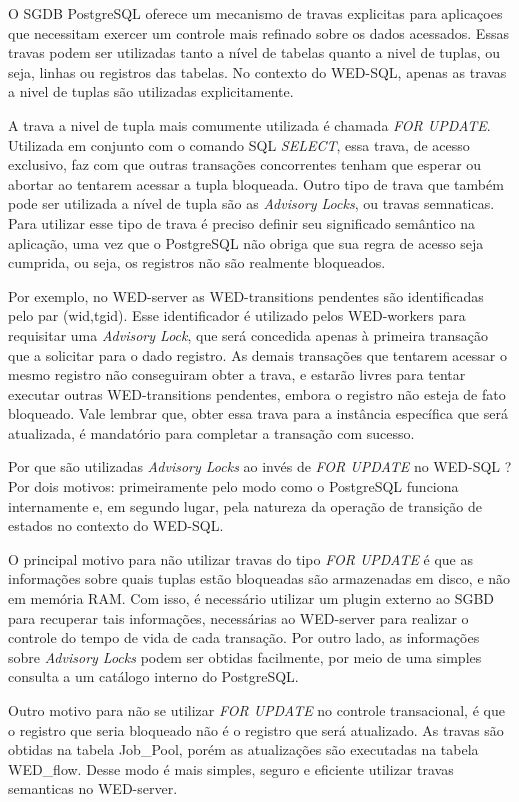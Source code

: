 \documentclass[conference]{IEEEtran}
\begin{document}
\par O SGDB PostgreSQL oferece um mecanismo de travas explicitas para aplicaçoes que necessitam exercer um controle mais
refinado sobre os dados acessados. Essas travas podem ser utilizadas tanto a nível de tabelas quanto a nivel de tuplas, ou seja,
linhas ou registros das tabelas. No contexto do WED-SQL, apenas as travas a nivel de tuplas são utilizadas explicitamente.
\par A trava a nivel de tupla mais comumente utilizada é chamada \emph{FOR UPDATE}. Utilizada em conjunto com o comando SQL
\emph{SELECT}, essa trava, de acesso exclusivo, faz com que outras transações concorrentes tenham que esperar ou abortar
ao tentarem acessar a tupla bloqueada. Outro tipo de trava que também pode ser utilizada a nível de tupla são as 
\emph{Advisory Locks}, ou travas semnaticas. Para utilizar esse tipo de trava é preciso definir seu significado semântico na aplicação, uma vez que
o PostgreSQL não obriga que sua regra de acesso seja cumprida, ou seja, os registros não são realmente bloqueados. 
\par Por exemplo, no WED-server as WED-transitions pendentes são identificadas pelo par (wid,tgid). Esse identificador é
utilizado pelos WED-workers para requisitar uma \emph{Advisory Lock}, que será concedida apenas à primeira transação que
a solicitar para o dado registro. As demais transações que tentarem acessar o mesmo registro não conseguiram obter a trava,
e estarão livres para tentar executar outras WED-transitions pendentes, embora o registro não esteja de fato bloqueado. Vale
lembrar que, obter essa trava para a instância específica que será atualizada, é mandatório para completar a transação com sucesso.
\par Por que são utilizadas \emph{Advisory Locks} ao invés de \emph{FOR UPDATE} no WED-SQL ? Por dois motivos: primeiramente
pelo modo como o PostgreSQL funciona internamente e, em segundo lugar, pela natureza da operação de  transição de estados
no contexto do WED-SQL. 
\par O principal motivo para não utilizar travas do tipo \emph{FOR UPDATE} é que as informações sobre
quais tuplas estão bloqueadas são armazenadas em disco, e não em memória RAM. Com isso, é necessário utilizar um plugin
externo ao SGBD para recuperar tais informações, necessárias ao WED-server para realizar o controle do tempo de vida
de cada transação. Por outro lado, as informações sobre \emph{Advisory Locks} podem ser obtidas facilmente, por meio de
uma simples consulta a um catálogo interno do PostgreSQL. 
\par Outro motivo para não se utilizar \emph{FOR UPDATE} no controle transacional, é que o registro que seria bloqueado
não é o registro que será atualizado. As travas são obtidas na tabela Job\_Pool, porém as atualizações são executadas na
tabela WED\_flow. Desse modo é mais simples, seguro e eficiente utilizar travas semanticas no WED-server.
\end{document}
